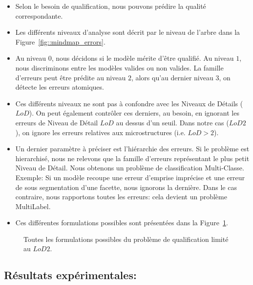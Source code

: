 \documentclass[a4paper,french]{article}
\begin{document}
    \begin{itemize}
        \item Selon le besoin de qualification, nous pouvons prédire la qualité correspondante.
        \item Les différents niveaux d'analyse sont décrit par le niveau de l'arbre dans la Figure~\ref{fig::mindmap_errors}.
        \item Au niveau $0$, nous décidons si le modèle mérite d'être qualifié. Au niveau $1$, nous discriminons entre les modèles valides ou non valides. La famille d'erreurs peut être prédite au niveau $2$, alors qu'au dernier niveau $3$, on détecte les erreurs atomiques.
        \item Ces différents niveaux ne sont pas à confondre avec les Niveaux de Détails ($LoD$). On peut également contrôler ces derniers, au besoin, en ignorant les erreurs de Niveau de Détail $LoD$ au dessus d'un seuil. Dans notre cas ($LoD 2$), on ignore les erreurs relatives aux microstructures (i.e. $LoD > 2$).
        \item Un dernier paramètre à préciser est l'hiérarchie des erreurs. Si le problème est hierarchisé, nous ne relevons que la famille d'erreurs représentant le plus petit Niveau de Détail. Nous obtenons un problème de classification Multi-Classe. Exemple: Si un modèle recoupe une erreur d'emprise imprécise et une erreur de sous segmentation d'une facette, nous ignorons la dernière. Dans le cas contraire, nous rapportons toutes les erreurs: cela devient un problème MultiLabel.
        \item Ces différentes formulations possibles sont présentées dans la Figure~\ref{fig::classification_problems}.
    \end{itemize}

    \begin{figure}[H]
        \begin{center}
            
            \caption{\label{fig::classification_problems} Toutes les formulations possibles du problème de qualification limité au $LoD 2$.}
        \end{center}
    \end{figure}

    \subsection{Résultats expérimentales:}
\end{document}
